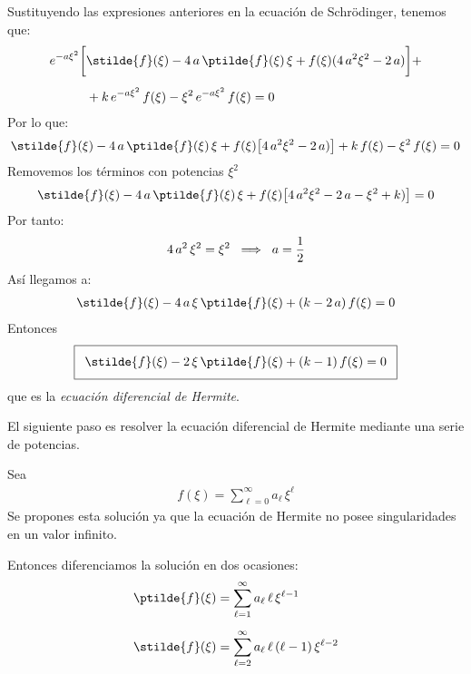 Sustituyendo las expresiones anteriores en la ecuación de Schrödinger, tenemos que:
\begin{align*}
e^{-a \xi^{2}} \bigg[ &\stilde{f}(\xi) - 4 \, a \, \ptilde{f}(\xi) \, \xi + f(\xi) (4 \, a^{2} \xi^{2} - 2 \, a) \bigg] + \\[0.5em]
&+ k \, e^{-a \xi^{2}} \, f(\xi) - \xi^{2} \, e^{-a \xi^{2}} \, f(\xi) = 0
\end{align*}
Por lo que:
\begin{align*}
\stilde{f}(\xi) - 4 \, a \, \ptilde{f}(\xi) \, \xi + f(\xi) \big[ 4 \, a^{2} \xi^{2} - 2 \, a) \big] + k \, f(\xi) - \xi^{2} \, f(\xi) = 0
\end{align*}
Removemos los términos con potencias $\xi^{2}$
\begin{align*}
\stilde{f}(\xi) - 4 \, a \, \ptilde{f}(\xi) \, \xi + f(\xi) \big[ 4 \, a^{2} \xi^{2} - 2 \, a - \xi^{2} +  k) \big] = 0
\end{align*}
Por tanto:
\begin{align*}
4 \, a^{2} \, \xi^{2} =  \xi^{2} \hspace{0.2cm} \Longrightarrow \hspace{0.2cm} a = \dfrac{1}{2}
\end{align*}
Así llegamos a:
\begin{align*}
\stilde{f}(\xi) - 4 \, a \, \xi \, \ptilde{f}(\xi) + (k - 2 \, a) \, f(\xi) = 0
\end{align*}
Entonces
\begin{align*}
\addtolength{\fboxsep}{5pt}\boxed{
\stilde{f} (\xi) - 2 \, \xi \, \ptilde{f}(\xi) + (k - 1) \, f(\xi) = 0}
\end{align*}
que es la \emph{ecuación diferencial de Hermite}.
\par
El siguiente paso es resolver la ecuación diferencial de Hermite mediante una serie de potencias.
\par
Sea
\begin{align*}
f(\xi) = \sum_{\ell=0}^{\infty} a_{\ell} \, \xi^{\ell}
\end{align*}
Se propones esta solución ya que la ecuación de Hermite no posee singularidades en un valor infinito.
\par
Entonces diferenciamos la solución en dos ocasiones:
\begin{align*}
\ptilde{f}(\xi) &= \sum_{\ell=1}^{\infty} a_{\ell} \, \ell \, \xi^{\ell-1} \\[0.5em]
\stilde{f}(\xi) &= \sum_{\ell=2}^{\infty} a_{\ell} \, \ell \, (\ell - 1) \, \xi^{\ell-2} 
\end{align*}
